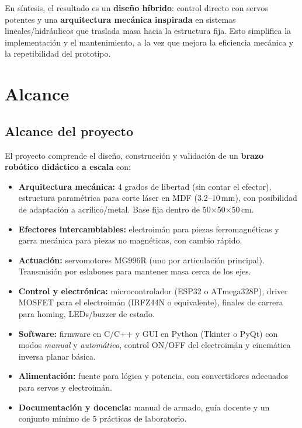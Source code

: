 En síntesis, el resultado es un \textbf{diseño híbrido}: control directo con servos potentes y una \textbf{arquitectura mecánica inspirada} en sistemas lineales/hidráulicos que traslada masa hacia la estructura fija. 
Esto simplifica la implementación y el mantenimiento, a la vez que mejora la eficiencia mecánica y la repetibilidad del prototipo.


\section{Alcance}

\subsection{Alcance del proyecto}
El proyecto comprende el diseño, construcción y validación de un \textbf{brazo robótico didáctico a escala} con:
\begin{itemize}
  \item \textbf{Arquitectura mecánica:} 4 grados de libertad (sin contar el efector), estructura paramétrica para corte láser en MDF (3.2--10\,mm), con posibilidad de adaptación a acrílico/metal. Base fija dentro de 50$\times$50$\times$50\,cm.
  \item \textbf{Efectores intercambiables:} electroimán para piezas ferromagnéticas y garra mecánica para piezas no magnéticas, con cambio rápido.
  \item \textbf{Actuación:} servomotores MG996R (uno por articulación principal). Transmisión por eslabones para mantener masa cerca de los ejes.
  \item \textbf{Control y electrónica:} microcontrolador (ESP32 o ATmega328P), driver MOSFET para el electroimán (IRFZ44N o equivalente), finales de carrera para homing, LEDs/buzzer de estado.
  \item \textbf{Software:} firmware en C/C++ y GUI en Python (Tkinter o PyQt) con modos \emph{manual} y \emph{automático}, control ON/OFF del electroimán y cinemática inversa planar básica.
  \item \textbf{Alimentación:} fuente para lógica y potencia, con convertidores adecuados para servos y electroimán.
  \item \textbf{Documentación y docencia:} manual de armado, guía docente y un conjunto mínimo de 5 prácticas de laboratorio.
\end{itemize}

